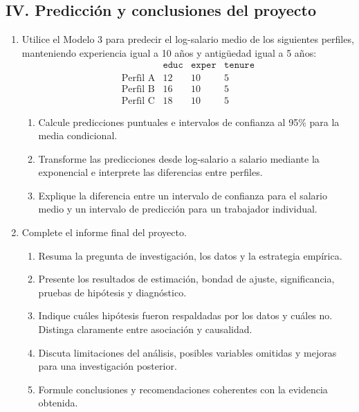 \documentclass[letterpaper,11pt]{article}
\begin{document}
\subsection*{IV. Predicción y conclusiones del proyecto}

\begin{enumerate}[resume]

\item Utilice el Modelo 3 para predecir el log-salario medio de los siguientes
    perfiles, manteniendo experiencia igual a 10 años y antigüedad igual a 5
    años:
    \[
    \begin{array}{c|ccc}
        &\texttt{educ}&\texttt{exper}&\texttt{tenure}\\ \hline
        \text{Perfil A}&12&10&5\\
        \text{Perfil B}&16&10&5\\
        \text{Perfil C}&18&10&5
    \end{array}
    \]
    \begin{enumerate}[label=(\alph*)]
        \item Calcule predicciones puntuales e intervalos de confianza al 95\%
              para la media condicional.
        \item Transforme las predicciones desde log-salario a salario mediante
              la exponencial e interprete las diferencias entre perfiles.
        \item Explique la diferencia entre un intervalo de confianza para el
              salario medio y un intervalo de predicción para un trabajador
              individual.
    \end{enumerate}

\item Complete el informe final del proyecto.
    \begin{enumerate}[label=(\alph*)]
        \item Resuma la pregunta de investigación, los datos y la estrategia
              empírica.
        \item Presente los resultados de estimación, bondad de ajuste,
              significancia, pruebas de hipótesis y diagnóstico.
        \item Indique cuáles hipótesis fueron respaldadas por los datos y cuáles
              no. Distinga claramente entre asociación y causalidad.
        \item Discuta limitaciones del análisis, posibles variables omitidas y
              mejoras para una investigación posterior.
        \item Formule conclusiones y recomendaciones coherentes con la
              evidencia obtenida.
    \end{enumerate}

\end{enumerate}
\end{document}
